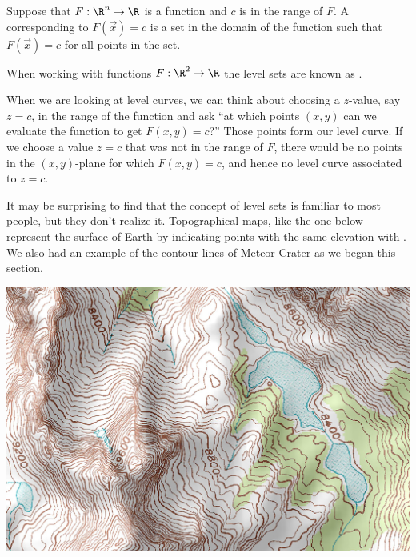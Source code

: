 \documentclass{ximera}
\begin{document}
\begin{definition}
  Suppose that $F:\R^n \to \R$ is a function and $c$ is in the range
  of $F$. A  corresponding to $F(\vec{x})=c$ is a set
  in the domain of the function such that $F(\vec{x}) = c$ for all
  points in the set.
\end{definition}

When working with functions $F:\R^2\to\R$ the level sets are known as
.

When we are looking at level curves, we can think about choosing
a $z$-value, say $z=c$, in the range of the function and ask ``at
which points $(x,y)$ can we evaluate the function to get $F(x,y)=c$?''
Those points form our level curve.    If we choose a value $z=c$ 
that was not in the range of $F$, there would be no points in the 
$(x,y)$-plane for which $F(x,y)=c$, and hence no level curve 
associated to $z = c$.



It may be surprising to find that the concept of level sets is
familiar to most people, but they don't realize it.  Topographical
maps, like the one below represent the surface of Earth by
indicating points with the same elevation with .  We also had an example of the contour lines of Meteor 
  Crater as we began this section.

\begin{image}%
  \includegraphics{topomap.jpg}
\end{image}
\end{document}
